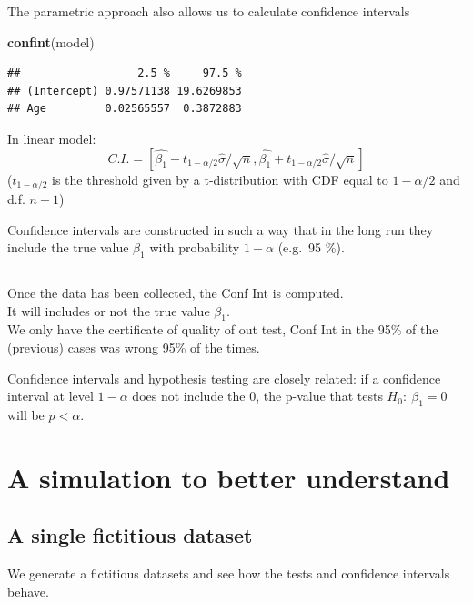 \documentclass[]{article}
\newenvironment{Shaded}{\begin{snugshade}}{\end{snugshade}}
\newcommand{\KeywordTok}[1]{\textcolor[rgb]{0.13,0.29,0.53}{\textbf{#1}}}
\newcommand{\NormalTok}[1]{#1}
\begin{document}
The parametric approach also allows us to calculate confidence intervals

\begin{Shaded}
\begin{Highlighting}[]
\KeywordTok{confint}\NormalTok{(model)}
\end{Highlighting}
\end{Shaded}

\begin{verbatim}
##                  2.5 %     97.5 %
## (Intercept) 0.97571138 19.6269853
## Age         0.02565557  0.3872883
\end{verbatim}

In linear model:
\[C.I.= [ \hat{\beta_1}-t_{1-\alpha/2} \hat{\sigma}/\sqrt{n}, \hat{\beta_1}+t_{1-\alpha/2} \hat{\sigma}/\sqrt{n}]\]
(\(t_{1-\alpha/2}\) is the threshold given by a t-distribution with CDF
equal to \(1-\alpha/2\) and d.f. \(n-1\))

Confidence intervals are constructed in such a way that in the long run
they include the true value \(\beta_1\) with probability \(1-\alpha\)
(e.g.~95 \%).

\begin{center}\rule{0.5\linewidth}{\linethickness}\end{center}

Once the data has been collected, the Conf Int is computed.\\
It will includes or not the true value \(\beta_1\).\\
We only have the certificate of quality of out test, Conf Int in the
95\% of the (previous) cases was wrong 95\% of the times.

Confidence intervals and hypothesis testing are closely related: if a
confidence interval at level \(1-\alpha\) does not include the 0, the
p-value that tests \(H_0:\ \beta_1 = 0\) will be \(p<\alpha\).

\section{A simulation to better
understand}\label{a-simulation-to-better-understand}

\subsection{A single fictitious
dataset}\label{a-single-fictitious-dataset}

We generate a fictitious datasets and see how the tests and confidence
intervals behave.
\end{document}
